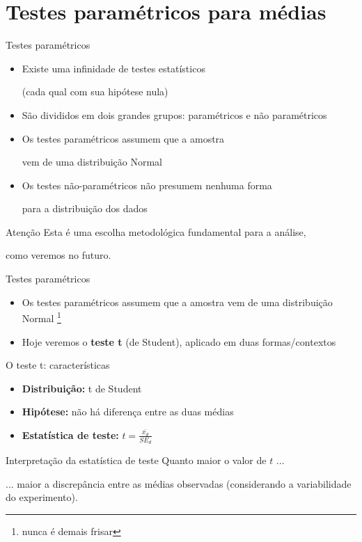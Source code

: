 \documentclass{beamer}
\begin{document}
\section{Testes paramétricos para médias}

\begin{frame}{\scriptsize Testes paramétricos}
  \begin{itemize}
    \scriptsize
  \item Existe uma infinidade de testes estatísticos

    {\tiny (cada qual com sua hipótese nula)}
  \item São divididos em dois grandes grupos: paramétricos e não paramétricos
    \bigskip
  \item Os testes paramétricos assumem que a amostra

    vem de uma \alert{distribuição Normal}
  \item Os testes não-paramétricos não presumem nenhuma forma

    para a distribuição dos dados
  \end{itemize}
  \bigskip
  \begin{block}{Atenção}
    \footnotesize
    Esta é uma escolha metodológica fundamental para a análise,

    como veremos no futuro.
  \end{block}
\end{frame}

\begin{frame}{\scriptsize Testes paramétricos}
  \begin{itemize}
    \footnotesize
  \item Os testes paramétricos assumem que a amostra vem de uma \alert{distribuição Normal} \footnote{\tiny nunca é demais frisar}
    \bigskip
  \item Hoje veremos o {\bf teste t} (de Student), aplicado em duas formas/contextos
  \end{itemize}
\end{frame}

\begin{frame}{\scriptsize O teste t: características}
  \begin{itemize}
    \footnotesize
  \item {\bf Distribuição:} t de Student
  \item {\bf Hipótese:} não há diferença entre as duas médias
  \item {\bf Estatística de teste:} $t = \frac{\bar{x_d}}{SE_d}$
  \end{itemize}
  \vfill
  \begin{block}{Interpretação da estatística de teste}
    \centering
    Quanto maior o valor de $t$ ...

    \bigskip
    ... maior a \alert{discrepância} entre as médias observadas
    ({\footnotesize considerando a variabilidade do experimento}).
  \end{block}
\end{frame}
\end{document}

